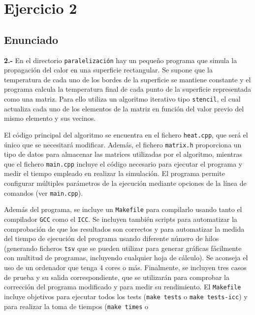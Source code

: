 \newpage
\section{Ejercicio 2}
\subsection{Enunciado}
\begin{ejer}
    \textbf{2.-} En el directorio \texttt{paralelización} hay un pequeño programa que simula la propagación del 
    calor en una superficie rectangular. Se supone que la temperatura de cada uno de los bordes de la
    superficie se mantiene constante y el programa calcula la temperatura final de cada punto de
    la superficie representada como una matriz. Para ello utiliza un algoritmo iterativo tipo \texttt{stencil},
    el cual actualiza cada uno de los elementos de la matriz en función del valor previo del mismo
    elemento y sus vecinos.
    \par El código principal del algoritmo se encuentra en el fichero \texttt{heat.cpp}, que será el único que se
    necesitará modificar. Además, el fichero \texttt{matrix.h} proporciona un tipo de datos para almacenar las
    matrices utilizadas por el algoritmo, mientras que el fichero \texttt{main.cpp} incluye el código necesario
    para ejecutar el programa y medir el tiempo empleado en realizar la simulación. El programa permite
     configurar múltiples parámetros de la ejecución mediante opciones de la línea de comandos 
     (ver \texttt{main.cpp}).
    \par Además del programa, se incluye un \texttt{Makefile} para compilarlo usando tanto el compilador \texttt{GCC}
    como el \texttt{ICC}. Se incluyen también scripts para automatizar la comprobación de que los resultados
    son correctos y para automatizar la medida del tiempo de ejecución del programa usando diferente
    número de hilos (generando ficheros \texttt{tsv} que se pueden utilizar para generar gráficas fácilmente
    con multitud de programas, incluyendo cualquier hoja de cálculo). Se aconseja el uso de un
    ordenador que tenga 4 cores o más. Finalmente, se incluyen tres casos de prueba y su salida
    correspondiente, que se utilizarán para comprobar la corrección del programa modificado y para
    medir su rendimiento. El \texttt{Makefile} incluye objetivos para ejecutar todos los tests
    (\texttt{make tests} o \texttt{make tests-icc}) y para realizar la toma de tiempos (\texttt{make times} o

\end{ejer}
